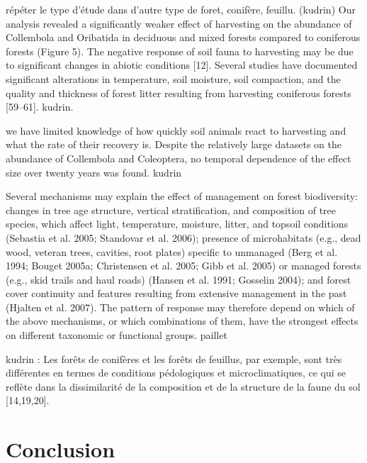   répéter le type d'étude dans d'autre type de foret, conifère, feuillu. (kudrin)
  Our analysis revealed a significantly weaker effect of harvesting on the abundance of Collembola and Oribatida in deciduous and mixed forests compared to coniferous forests (Figure 5). The negative response of soil fauna to harvesting may be due to significant changes in abiotic conditions [12]. Several studies have documented significant alterations in temperature, soil moisture, soil compaction, and the quality and thickness of forest litter resulting from harvesting coniferous forests [59–61]. kudrin.

  we have limited knowledge of how quickly soil animals react to harvesting and what the rate of their recovery is.
  Despite the relatively large datasets on the abundance of Collembola and Coleoptera, no temporal dependence of the effect size over twenty years was found. kudrin


  Several mechanisms may explain the effect of management on forest biodiversity: changes in tree age structure, vertical stratification, and composition of tree species, which affect light, temperature, moisture, litter, and topsoil conditions (Sebastia et al. 2005; Standovar et al. 2006); presence of microhabitats (e.g., dead wood, veteran trees, cavities, root plates) specific to unmanaged (Berg et al. 1994; Bouget 2005a; Christensen et al. 2005; Gibb et al. 2005) or managed forests (e.g., skid trails and haul roads) (Hansen et al. 1991; Gosselin 2004); and forest cover continuity and features resulting from extensive management in the past (Hjalten et al. 2007). The pattern of response may therefore depend on which of the above mechanisms, or which combinations of them, have the strongest effects on different taxonomic or functional groups. paillet 

  kudrin :
Les forêts de conifères et les forêts de feuillus, par exemple, sont très différentes en termes de conditions pédologiques et microclimatiques, ce qui se reflète dans la dissimilarité de la composition et de la structure de la faune du sol [14,19,20].


\section*{Conclusion}
\label{sec:conclu1}

